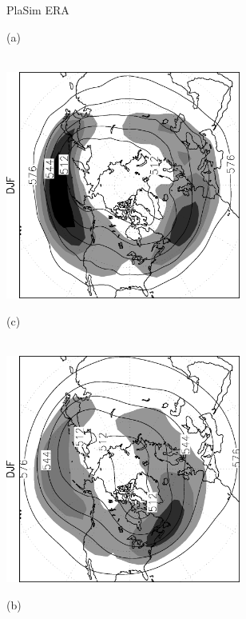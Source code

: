 \documentclass[12pt,a4paper,twoside,openright,headinclude,liststotoc,bibtotoc]{scrreprt}
\begin{document}
\begin{figure}[b]
\hspace{3.1cm}PlaSim \vspace{-0.1cm}\hspace{7.3cm} ERA \\
\parbox{8.5cm}{\hspace{0.02cm}\begin{scriptsize}(a)\end{scriptsize} \vspace{-0.3cm} \\
\includegraphics[height=7.5cm,angle=-90]
{eps/NHz500StdbpDJF.eps}
}
\parbox{8.5cm}{\hspace{0.02cm}\begin{scriptsize}(c)\end{scriptsize} \vspace{-0.3cm} \\
\includegraphics[height=7.5cm,angle=-90]
{eps/NHt21z500StdbpDJF.eps}
}
\parbox{8.5cm}{\hspace{0.02cm}\begin{scriptsize}(b)\end{scriptsize} \vspace{-0.3cm} \\ 
}
\end{figure}
\end{document}
